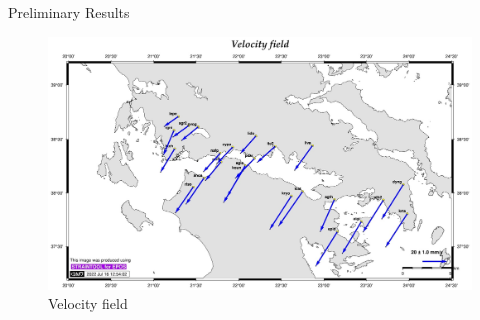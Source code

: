 \documentclass[final,a0,portrait]{beamer}
\newlength{\onecolwid}
\begin{document}
\begin{frame}[t]
\begin{columns}[t]
\begin{column}{\onecolwid}

\begin{block}{Preliminary Results}
{\small


\begin{figure}
  \centering
  \includegraphics[width=1\onecolwid]{gsg2022_vel.jpg}
  \caption{Velocity field}
  \label{fig:crvels}
\end{figure}

}
\end{block}
\end{column}
\end{columns}
\end{frame}
\end{document}
